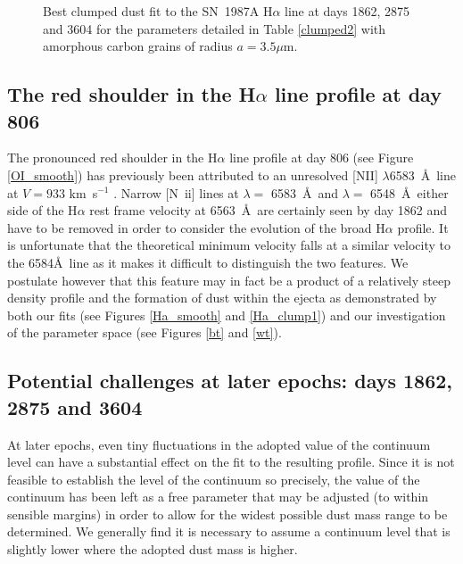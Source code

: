 \documentclass[useAMS,usenatbib,usegraphicx]{mnras}
\begin{document}
\begin{figure}
\caption{Best clumped dust fit to the SN~1987A  H$\alpha$ line at days 1862, 2875 and 
3604 for the parameters detailed in Table \ref{clumped2} with amorphous carbon grains of radius $a=3.5\mu$m.}
\label{d1862_3604_cmax}

\end{figure}

\subsection{The red shoulder in the H$\alpha$ line profile at day 806}

The pronounced red shoulder in the H$\alpha$ line profile at day 806 (see Figure \ref{OI_smooth}) has previously been 
attributed to an unresolved [NII] $\lambda$6583~\AA\ line at $V=933$ 
km~s$^{-1}$ \citep{Kozma1997}.  Narrow [N~{\sc ii}] lines at $\lambda=$ 
6583~\AA\ and $\lambda=$ 6548~\AA\ either side of the H$\alpha$ rest frame
 velocity at 6563~\AA\ are certainly seen by day 1862 and have to be 
removed in order to consider the evolution of the broad H$\alpha$ profile. 
It is  unfortunate that the theoretical minimum velocity falls at 
a similar velocity to the 6584\AA\ line as it makes it difficult to distinguish 
the two features.  We postulate however that this feature may in fact be a 
product of a relatively steep density profile and the formation of dust 
within the ejecta as demonstrated by both our fits (see Figures 
\ref{Ha_smooth} and \ref{Ha_clump1}) and our investigation of the parameter 
space (see Figures \ref{bt} and \ref{wt}).



\subsection{Potential challenges at later epochs: days 1862, 2875 and 3604}

At later epochs, even  tiny fluctuations in the adopted value of the 
continuum level can have a substantial effect on the fit to the resulting 
profile.  Since it is not feasible to establish the level of the continuum 
so precisely, the value of the continuum has been left as a free parameter 
that may be adjusted (to within sensible margins) in order to allow for 
the widest possible dust mass range to be determined.  We generally find 
it is necessary to assume a continuum level that is slightly lower where 
the adopted dust mass is higher.
\end{document}
